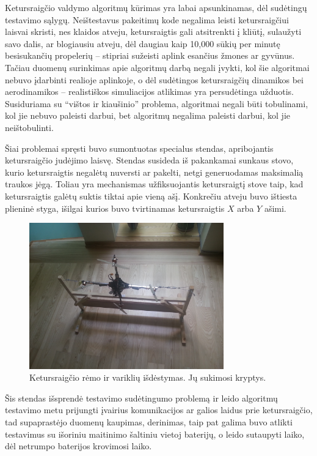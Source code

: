 \documentclass[12pt, a4paper, lithuanian, final]{article}
\begin{document}
Ketursraigčio valdymo algoritmų kūrimas yra labai apsunkinamas, dėl sudėtingų testavimo sąlygų.
Neištestavus pakeitimų kode negalima leisti ketursraigčiui laisvai skristi, nes klaidos atveju, ketursraigtis gali atsitrenkti į kliūtį, sulaužyti savo dalis, ar blogiausiu atveju, dėl daugiau kaip 10,000 sūkių per minutę besisukančių propelerių -- stipriai sužeisti aplink esančius žmones ar gyvūnus.
Tačiau duomenų surinkimas apie algoritmų darbą negali įvykti, kol šie algoritmai nebuvo įdarbinti realioje aplinkoje, o dėl sudėtingos ketursraigčių dinamikos bei aerodinamikos -- realistiškos simuliacijos atlikimas yra persudėtinga užduotis.
Susiduriama su "`vištos ir kiaušinio"' problema, algoritmai negali būti tobulinami, kol jie nebuvo paleisti darbui, bet algoritmų negalima paleisti darbui, kol jie neištobulinti.

Šiai problemai spręsti buvo sumontuotas specialus stendas, apribojantis ketursraigčio judėjimo laisvę.
Stendas susideda iš pakankamai sunkaus stovo, kurio ketursraigtis negalėtų nuversti ar pakelti, netgi generuodamas maksimalią traukos jėgą.
Toliau yra mechanismas užfiksuojantis ketursraigtį stove taip, kad ketursraigtis galėtų suktis tiktai apie vieną ašį.
Konkrečiu atveju buvo ištiesta plieninė styga, išilgai kurios buvo tvirtinamas ketursraigtis $X$ arba $Y$ ašimi.

\begin{figure}[H]
\begin{center}
\includegraphics[width=0.75\textwidth]{img/frame.jpg}
\caption{Ketursraigčio rėmo ir variklių išdėstymas. Jų sukimosi kryptys.}
\end{center}
\end{figure}



Šis stendas išsprendė testavimo sudėtingumo problemą ir leido algoritmų testavimo metu prijungti įvairius komunikacijos ar galios laidus prie ketursraigčio, tad supaprastėjo duomenų kaupimas, derinimas, taip pat galima buvo atlikti testavimus su išoriniu maitinimo šaltiniu vietoj baterijų, o leido sutaupyti laiko, dėl netrumpo baterijos krovimosi laiko.
\end{document}
